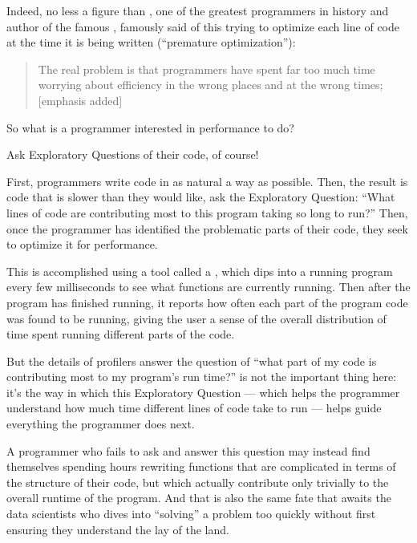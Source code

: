 \documentclass[letterpaper,10pt,english]{jupyterBook}
\begin{document}
\sphinxAtStartPar
Indeed, no less a figure than , one of the greatest programmers in history and author of the famous , famously said of this trying to optimize each line of code at the time it is being written (“premature optimization”):
\begin{quote}

\sphinxAtStartPar
The real problem is that programmers have spent far too much time worrying about efficiency in the wrong places and at the wrong times;  {[}emphasis added{]}
\end{quote}

\sphinxAtStartPar
So what is a programmer interested in performance to do?

\sphinxAtStartPar
Ask Exploratory Questions of their code, of course!

\sphinxAtStartPar
First, programmers write code in as natural a way as possible. Then,  the result is code that is slower than they would like, ask the Exploratory Question: “What lines of code are contributing most to this program taking so long to run?” Then, once the programmer has identified the problematic parts of their code, they seek to optimize it for performance.

\sphinxAtStartPar
This is accomplished using a tool called a , which dips into a running program every few milliseconds to see what functions are currently running. Then after the program has finished running, it reports how often each part of the program code was found to be running, giving the user a sense of the overall distribution of time spent running different parts of the code.

\sphinxAtStartPar
But the details of  profilers answer the question of “what part of my code is contributing most to my program’s run time?” is not the important thing here: it’s the way in which this Exploratory Question — which helps the programmer understand how much time different lines of code take to run  — helps guide everything the programmer does next.

\sphinxAtStartPar
A programmer who fails to ask and answer this question may instead find themselves spending hours re\sphinxhyphen{}writing functions that are complicated in terms of the structure of their code, but which actually contribute only trivially to the overall runtime of the program. And that is also the same fate that awaits the data scientists who dives into “solving” a problem too quickly without first ensuring they understand the lay of the land.
\end{document}
